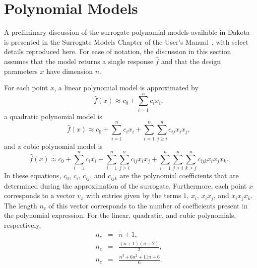 \section{Polynomial Models}\label{sec:poly_surr}

A preliminary discussion of the surrogate polynomial models available in
Dakota is presented in the Surrogate Models Chapter of the User's 
Manual~\cite{UsersMan}, with select details reproduced here. For ease of 
notation, the discussion in this section assumes that the model returns a 
single response $\hat{f}$ and that the design parameters $x$ have dimension $n$. 

For each point $x$, a linear polynomial model is approximated by
\begin{equation}
\hat{f}(x) \approx c_0 + \sum_{i = 1}^{n} c_i x_i,
\end{equation}
a quadratic polynomial model is 
\begin{equation}
\hat{f}(x) \approx c_0 + \sum_{i = 1}^{n} c_i x_i + \sum_{i = 1}^{n} 
\sum_{j \geq i}^{n} c_{ij} x_i x_j,
\end{equation}
and a cubic polynomial model is
\begin{equation}
\hat{f}(x) \approx c_0 + \sum_{i = 1}^{n} c_i x_i + \sum_{i = 1}^{n} 
\sum_{j \geq i}^{n} c_{ij} x_i x_j + \sum_{i = 1}^{n} \sum_{j \geq i}^{n}
\sum_{k \geq j}^{n} c_{ijk} x_i x_j x_k.
\end{equation}
In these equations, $c_0$, $c_i$, $c_{ij}$, and $c_{ijk}$ are the polynomial
coefficients that are determined during the approximation of the surrogate. 
Furthermore, each point $x$ corresponds to a vector $v_x$ with entries given 
by the terms $1$, $x_i$, $x_i x_j$, and $x_i x_j x_k$. The length $n_c$ of 
this vector corresponds to the number of coefficients present in the polynomial 
expression. For the linear, quadratic, and cubic polynomials, respectively,
\begin{eqnarray}
n_{c} 	&=& n+1, \\
n_{c} 	&=& \frac{(n+1)(n+2)}{2}, \\
n_{c}	&=& \frac{n^3 + 6n^2 + 11n + 6}{6}.
\end{eqnarray} 


